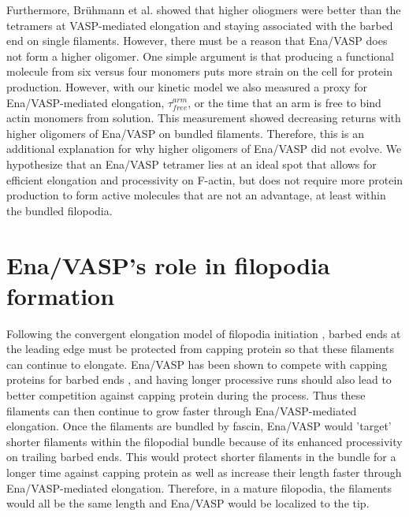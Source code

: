 Furthermore, Br\"{u}hmann et al. showed that higher oliogmers were better than the tetramers at VASP-mediated elongation and staying associated with the barbed end on single filaments. However, there must be a reason that Ena/VASP does not form a higher oligomer. One simple argument is that producing a functional molecule from six versus four monomers puts more strain on the cell for protein production. However, with our kinetic model we also measured a proxy for Ena/VASP-mediated elongation, $\tau_{free}^{arm}$, or the time that an arm is free to bind actin monomers from solution. This measurement showed decreasing returns with higher oligomers of Ena/VASP on bundled filaments. Therefore, this is an additional explanation for why higher oligomers of Ena/VASP did not evolve. We hypothesize that an Ena/VASP tetramer lies at an ideal spot that allows for efficient elongation and processivity on F-actin, but does not require more protein production to form active molecules that are not an advantage, at least within the bundled filopodia. 

\section{Ena/VASP's role in filopodia formation}\label{ena-filopodia-conclusions}

Following the convergent elongation model of filopodia initiation \citep{svitkina_mechanism_2003}, barbed ends at the leading edge must be protected from capping protein so that these filaments can continue to elongate. Ena/VASP has been shown to compete with capping proteins for barbed ends \citep{applewhite_ena/vasp_2007,barzik_ena/vasp_2005, winkelman_ena/vasp_2014}, and having longer processive runs should also lead to better competition against capping protein during the process. Thus these filaments can then continue to grow faster through Ena/VASP-mediated elongation. Once the filaments are bundled by fascin, Ena/VASP would 'target' shorter filaments within the filopodial bundle because of its enhanced processivity on trailing barbed ends. This would protect shorter filaments in the bundle for a longer time against capping protein as well as increase their length faster through Ena/VASP-mediated elongation. Therefore, in a mature filopodia, the filaments would all be the same length and Ena/VASP would be localized to the tip.


